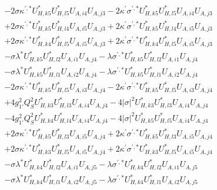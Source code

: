\begin{align}
 &-2 \sigma \kappa^{\prime,*} U^*_{{H},{k 5}} U^*_{{H},{l 5}} U_{A,{i 4}} U_{A,{j 3}} -2 \kappa^\prime \sigma^{\prime,*} U^*_{{H},{k 5}} U^*_{{H},{l 5}} U_{A,{i 4}} U_{A,{j 3}} \nonumber \\ 
 &+2 \sigma \kappa^{\prime,*} U^*_{{H},{k 5}} U^*_{{H},{l 4}} U_{A,{i 5}} U_{A,{j 3}} +2 \kappa^\prime \sigma^{\prime,*} U^*_{{H},{k 5}} U^*_{{H},{l 4}} U_{A,{i 5}} U_{A,{j 3}} \nonumber \\ 
 &+2 \sigma \kappa^{\prime,*} U^*_{{H},{k 4}} U^*_{{H},{l 5}} U_{A,{i 5}} U_{A,{j 3}} +2 \kappa^\prime \sigma^{\prime,*} U^*_{{H},{k 4}} U^*_{{H},{l 5}} U_{A,{i 5}} U_{A,{j 3}} \nonumber \\ 
 &- \sigma \lambda^* U^*_{{H},{k 5}} U^*_{{H},{l 2}} U_{A,{i 1}} U_{A,{j 4}} - \lambda \sigma^{\prime,*} U^*_{{H},{k 5}} U^*_{{H},{l 2}} U_{A,{i 1}} U_{A,{j 4}} \nonumber \\ 
 &- \sigma \lambda^* U^*_{{H},{k 5}} U^*_{{H},{l 1}} U_{A,{i 2}} U_{A,{j 4}} - \lambda \sigma^{\prime,*} U^*_{{H},{k 5}} U^*_{{H},{l 1}} U_{A,{i 2}} U_{A,{j 4}} \nonumber \\ 
 &-2 \sigma \kappa^{\prime,*} U^*_{{H},{k 5}} U^*_{{H},{l 5}} U_{A,{i 3}} U_{A,{j 4}} -2 \kappa^\prime \sigma^{\prime,*} U^*_{{H},{k 5}} U^*_{{H},{l 5}} U_{A,{i 3}} U_{A,{j 4}} \nonumber \\ 
 &+4 g_{1'}^{2} Q_{S}^{2} U^*_{{H},{k 3}} U^*_{{H},{l 3}} U_{A,{i 4}} U_{A,{j 4}} -4 |\sigma|^2 U^*_{{H},{k 3}} U^*_{{H},{l 3}} U_{A,{i 4}} U_{A,{j 4}} \nonumber \\ 
 &-4 g_{1'}^{2} Q_{S}^{2} U^*_{{H},{k 4}} U^*_{{H},{l 4}} U_{A,{i 4}} U_{A,{j 4}} -4 |\sigma|^2 U^*_{{H},{k 5}} U^*_{{H},{l 5}} U_{A,{i 4}} U_{A,{j 4}} \nonumber \\ 
 &+2 \sigma \kappa^{\prime,*} U^*_{{H},{k 5}} U^*_{{H},{l 3}} U_{A,{i 5}} U_{A,{j 4}} +2 \kappa^\prime \sigma^{\prime,*} U^*_{{H},{k 5}} U^*_{{H},{l 3}} U_{A,{i 5}} U_{A,{j 4}} \nonumber \\ 
 &+2 \sigma \kappa^{\prime,*} U^*_{{H},{k 3}} U^*_{{H},{l 5}} U_{A,{i 5}} U_{A,{j 4}} +2 \kappa^\prime \sigma^{\prime,*} U^*_{{H},{k 3}} U^*_{{H},{l 5}} U_{A,{i 5}} U_{A,{j 4}} \nonumber \\ 
 &- \sigma \lambda^* U^*_{{H},{k 4}} U^*_{{H},{l 2}} U_{A,{i 1}} U_{A,{j 5}} - \lambda \sigma^{\prime,*} U^*_{{H},{k 4}} U^*_{{H},{l 2}} U_{A,{i 1}} U_{A,{j 5}} \nonumber \\ 
 &- \sigma \lambda^* U^*_{{H},{k 4}} U^*_{{H},{l 1}} U_{A,{i 2}} U_{A,{j 5}} - \lambda \sigma^{\prime,*} U^*_{{H},{k 4}} U^*_{{H},{l 1}} U_{A,{i 2}} U_{A,{j 5}} \nonumber \\ 

\end{align}
